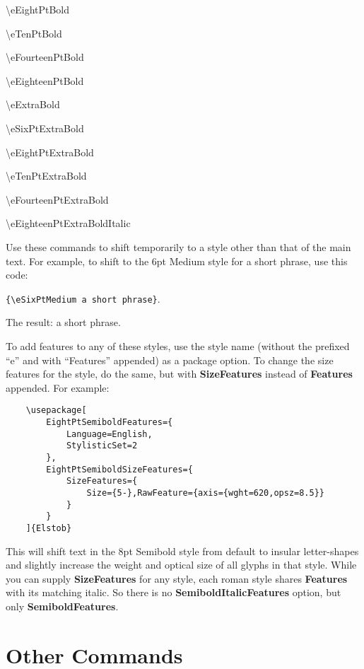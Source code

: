 \documentclass[12pt]{article}
\begin{document}
\begin{multicols}{2}
\noindent\textbackslash eEightPtBold

\noindent\textbackslash eTenPtBold

\noindent\textbackslash eFourteenPtBold

\noindent\textbackslash eEighteenPtBold

\noindent\textbackslash eExtraBold

\noindent\textbackslash eSixPtExtraBold

\noindent\textbackslash eEightPtExtraBold

\noindent\textbackslash eTenPtExtraBold

\noindent\textbackslash eFourteenPtExtraBold

\noindent\textbackslash eEighteenPtExtraBoldItalic
\end{multicols}

\noindent Use these commands
to shift temporarily to a style other than that of the main text.
For example, to shift to the 6pt Medium style for a short phrase, use
this code:
\begin{center}
{\color{BrickRed}\small\verb|{\eSixPtMedium a short phrase}|}.
\end{center}
The result: {\eSixPtMedium a short phrase}.

To add features to any of these styles, use the style name
(without the prefixed “e” and with “Features” appended)
as a package option. To change the size features for the style,
do the same, but with \textbf{SizeFeatures} instead of \textbf{Features}
appended. For example:

\footnotesize
\begin{verbatim}
    \usepackage[
        EightPtSemiboldFeatures={
            Language=English,
            StylisticSet=2
        },
        EightPtSemiboldSizeFeatures={
            SizeFeatures={
                Size={5-},RawFeature={axis={wght=620,opsz=8.5}}
            }
        }
    ]{Elstob}
\end{verbatim}\normalsize

\noindent This will shift text in the 8pt Semibold style from default to insular
letter-shapes and slightly increase the weight and optical size of all glyphs in that style.
While you can supply \textbf{SizeFeatures} for any style, each roman style shares
\textbf{Features} with its matching italic. So there is no \textbf{SemiboldItalicFeatures}
option, but only \textbf{SemiboldFeatures}.

\section{Other Commands}
\end{document}
